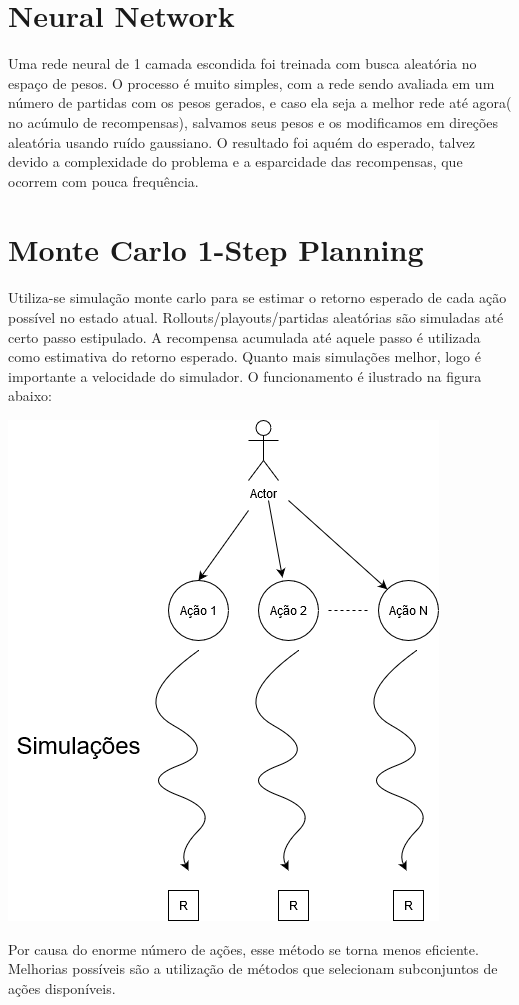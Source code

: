 \documentclass[]{book}
\begin{document}
\section{Neural Network}\label{neural-network}

Uma rede neural de 1 camada escondida foi treinada com busca aleatória
no espaço de pesos. O processo é muito simples, com a rede sendo
avaliada em um número de partidas com os pesos gerados, e caso ela seja
a melhor rede até agora( no acúmulo de recompensas), salvamos seus pesos
e os modificamos em direções aleatória usando ruído gaussiano. O
resultado foi aquém do esperado, talvez devido a complexidade do
problema e a esparcidade das recompensas, que ocorrem com pouca
frequência.

\section{Monte Carlo 1-Step Planning}\label{monte-carlo-1-step-planning}

Utiliza-se simulação monte carlo para se estimar o retorno esperado de
cada ação possível no estado atual. Rollouts/playouts/partidas
aleatórias são simuladas até certo passo estipulado. A recompensa
acumulada até aquele passo é utilizada como estimativa do retorno
esperado. Quanto mais simulações melhor, logo é importante a velocidade
do simulador. O funcionamento é ilustrado na figura abaixo:

\begin{center}\includegraphics[width=0.5\linewidth]{content/imgs/MC} \end{center}

Por causa do enorme número de ações, esse método se torna menos
eficiente. Melhorias possíveis são a utilização de métodos que
selecionam subconjuntos de ações disponíveis.
\end{document}
